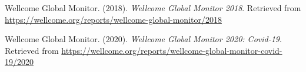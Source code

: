 \documentclass[
  doc,floatsintext]{apa6}
\newlength{\cslhangindent}
\newenvironment{CSLReferences}[2] %
 {\begin{list}{}{%
  \setlength{\itemindent}{0pt}
  \setlength{\leftmargin}{0pt}
  \setlength{\parsep}{0pt}
  \ifodd #1
   \setlength{\leftmargin}{\cslhangindent}
   \setlength{\itemindent}{-1\cslhangindent}
  \fi
  \setlength{\itemsep}{#2\baselineskip}}}
 {\end{list}}
\begin{document}
\begin{CSLReferences}{1}{0}
Wellcome Global Monitor. (2018). \emph{Wellcome Global Monitor 2018}. Retrieved from \url{https://wellcome.org/reports/wellcome-global-monitor/2018}

Wellcome Global Monitor. (2020). \emph{Wellcome Global Monitor 2020: Covid-19}. Retrieved from \url{https://wellcome.org/reports/wellcome-global-monitor-covid-19/2020}

\end{CSLReferences}

\newpage

\appendix
\end{document}
